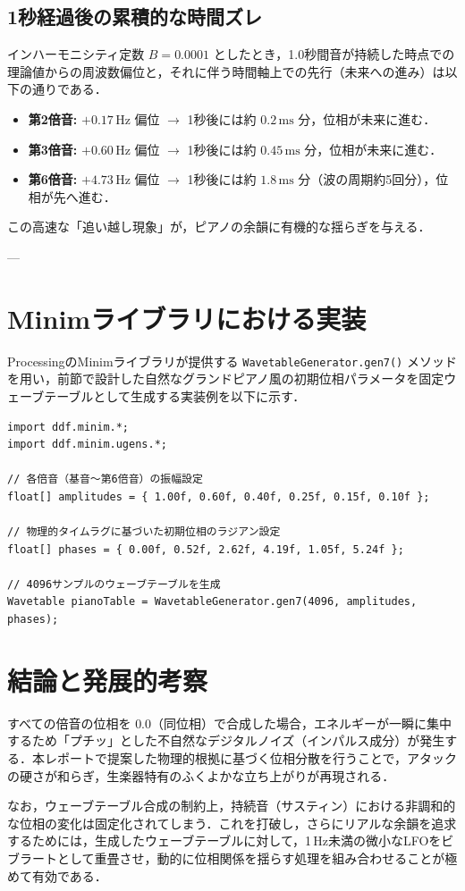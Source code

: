 \documentclass[uplatex,dvipdfmx]{jlreq}
\begin{document}
\subsection{1秒経過後の累積的な時間ズレ}
インハーモニシティ定数 $B = 0.0001$ としたとき，1.0秒間音が持続した時点での理論値からの周波数偏位と，それに伴う時間軸上での先行（未来への進み）は以下の通りである．
\begin{itemize}
    \item \textbf{第2倍音:} $+0.17\,\text{Hz}$ 偏位 $\rightarrow$ 1秒後には約 $0.2\,\text{ms}$ 分，位相が未来に進む．
    \item \textbf{第3倍音:} $+0.60\,\text{Hz}$ 偏位 $\rightarrow$ 1秒後には約 $0.45\,\text{ms}$ 分，位相が未来に進む．
    \item \textbf{第6倍音:} $+4.73\,\text{Hz}$ 偏位 $\rightarrow$ 1秒後には約 $1.8\,\text{ms}$ 分（波の周期約5回分），位相が先へ進む．
\end{itemize}
この高速な「追い越し現象」が，ピアノの余韻に有機的な揺らぎを与える．

---

\section{Minimライブラリにおける実装}
ProcessingのMinimライブラリが提供する \texttt{WavetableGenerator.gen7()} メソッドを用い，前節で設計した自然なグランドピアノ風の初期位相パラメータを固定ウェーブテーブルとして生成する実装例を以下に示す．

\begin{lstlisting}[caption=WavetableGeneratorを用いたピアノ音色波形の生成]
import ddf.minim.*;
import ddf.minim.ugens.*;

// 各倍音（基音〜第6倍音）の振幅設定
float[] amplitudes = { 1.00f, 0.60f, 0.40f, 0.25f, 0.15f, 0.10f };

// 物理的タイムラグに基づいた初期位相のラジアン設定
float[] phases = { 0.00f, 0.52f, 2.62f, 4.19f, 1.05f, 5.24f };

// 4096サンプルのウェーブテーブルを生成
Wavetable pianoTable = WavetableGenerator.gen7(4096, amplitudes, phases);
\end{lstlisting}

\section{結論と発展的考察}
すべての倍音の位相を $0.0$（同位相）で合成した場合，エネルギーが一瞬に集中するため「プチッ」とした不自然なデジタルノイズ（インパルス成分）が発生する．本レポートで提案した物理的根拠に基づく位相分散を行うことで，アタックの硬さが和らぎ，生楽器特有のふくよかな立ち上がりが再現される．

なお，ウェーブテーブル合成の制約上，持続音（サスティン）における非調和的な位相の変化は固定化されてしまう．これを打破し，さらにリアルな余韻を追求するためには，生成したウェーブテーブルに対して，1\,Hz未満の微小なLFOをビブラートとして重畳させ，動的に位相関係を揺らす処理を組み合わせることが極めて有効である．
\end{document}
